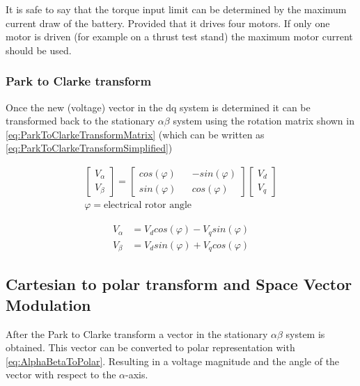 \documentclass[]{report}
\begin{document}
It is safe to say that the torque input limit can be determined by the maximum current draw of the battery. Provided that it drives four motors. If only one motor is driven (for example on a thrust test stand) the maximum motor current should be used.


\subsubsection{Park to Clarke transform}
Once the new (voltage) vector in the dq system is determined it can be transformed back to the stationary $\alpha\beta$ system using the rotation matrix shown in \autoref{eq:ParkToClarkeTransformMatrix} (which can be written as \autoref{eq:ParkToClarkeTransformSimplified})

\begin{equation} \label{eq:ParkToClarkeTransformMatrix}
	\begin{split}
		\begin{bmatrix} V_\alpha \\ V_\beta \end{bmatrix}
		= 
		\begin{bmatrix}
			cos(\varphi) && -sin(\varphi) \\
			sin(\varphi) && cos(\varphi)
		\end{bmatrix}
		\begin{bmatrix} V_d \\ V_q \end{bmatrix} \\
		\varphi = \text{electrical rotor angle}
	\end{split}	
\end{equation}

\begin{equation} \label{eq:ParkToClarkeTransformSimplified}
	\begin{split}
		V_\alpha &= V_d cos(\varphi) - V_q sin(\varphi) \\
		V_\beta &= V_d sin(\varphi) + V_q cos(\varphi)
	\end{split}
\end{equation}

\subsection{Cartesian to polar transform and Space Vector Modulation}
After the Park to Clarke transform a vector in the stationary $\alpha\beta$ system is obtained. This vector can be converted to polar representation with \autoref{eq:AlphaBetaToPolar}. Resulting in a voltage magnitude and the angle of the vector with respect to the $\alpha$-axis.
\end{document}
